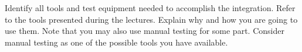 Identify all tools and test equipment needed to accomplish the integration. Refer to the tools presented during the lectures. Explain why and how you are going to use them.
Note that you may also use manual testing for some part. Consider manual testing as one of the possible tools you have available.
